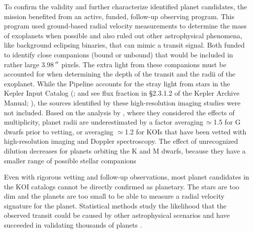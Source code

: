 To confirm the validity and further characterize identified planet candidates, the \Kepler{} mission benefited from an active, funded, follow-up observing program. This program used ground-based radial velocity measurements to determine the mass of exoplanets \citep[e.g.,][]{Marcy2014} when possible and also ruled out other astrophysical phenomena, like background eclipsing binaries, that can mimic a transit signal.  Both funded to identify close companions (bound or unbound) that would be included in  rather large 3.98\,$\mbox{$^{\prime\prime}$}$ pixels.  The extra light from these companions must be accounted for when determining the depth of the transit and the radii of the exoplanet.  While the \Kepler{} Pipeline accounts for the stray light from stars in the Kepler Input Catalog (\citealt{Brown2011}; and see flux fraction in \S2.3.1.2 of the Kepler Archive Manual; \citealt{Thompson2016KAM}), the sources identified by these high-resolution imaging studies were not included.  Based on the analysis by \citet{Ciardi2015}, where they considered the effects of multiplicity, planet radii are underestimated by a factor averaging\,$\simeq$1.5 for G dwarfs prior to vetting, or averaging $\simeq$1.2 for KOIs that have been vetted with high-resolution imaging and Doppler spectroscopy.  The effect of unrecognized dilution decreases for planets orbiting the K and M dwarfs, because they have a smaller range of possible stellar companions


Even with rigorous vetting and follow-up observations, most planet candidates in the KOI catalogs cannot be directly confirmed as planetary. The stars are too dim and the planets are too small to be able to measure a radial velocity signature for the planet.   Statistical methods study the likelihood that the observed transit could be caused by other astrophysical scenarios and have succeeded in validating thousands of \Kepler{} planets \citep[e.g.][]{Morton2016,Torres2015,Rowe2014,Lissauer2014}.  

